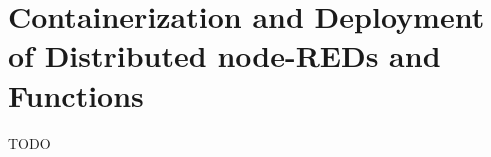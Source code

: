 \chapter{Containerization and Deployment of Distributed node-REDs and Functions\label{cha:docker}}

TODO